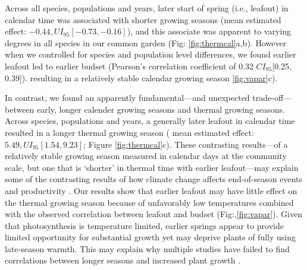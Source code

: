 \documentclass{article}[12pt]
\begin{document}
Across all species, populations and years, later start of spring (i.e., leafout) in calendar time was associated with shorter growing seasons (mean estimated effect: $-0.44, UI_{95}[-0.73, -0.16]$), and this associate was apparent to varying degrees in all species in our common garden (Fig: \ref{fig:thermcal}a,b). However when we controlled for species and population level differences, we found earlier leafout led to earlier budset (Pearson's correlation coefficient of 0.32 $CI_{95}$[0.25, 0.39]). resulting in a relatively stable calendar growing season \ref{fig:vapar}c).

In contrast, we found an apparently fundamental---and unexpected trade-off---between early, longer calender growing seasons and thermal growing seasons. Across species, populations and years, a generally later leafout in calendar time resulted in a longer thermal growing season ( mean estimated effect: $5.49, UI_{95}[1.54, 9.23]$; Figure \ref{fig:thermcal}c). These contrasting results---of a relatively stable growing season measured in calendar days at the community scale, but one that is `shorter' in thermal time with earlier leafout---may explain some of the contrasting results of how climate change affects end-of-season events and productivity \citep{Zani2020}. Our results show that earlier leafout may have little effect on the thermal growing season because of unfavorably low temperatures combined with the observed correlation between leafout and budset (Fig:,\ref{fig:vapar}). Given that photosynthesis is temperature limited, earlier springs appear to provide limited opportunity for substantial growth yet may deprive plants of fully using late-season warmth. This may explain why multiple studies have failed to find correlations between longer seasons and increased plant growth \citep{cufar2015variations,camarero2022decoupled,dow2022warm,silvestro2023longer}. %
\end{document}
